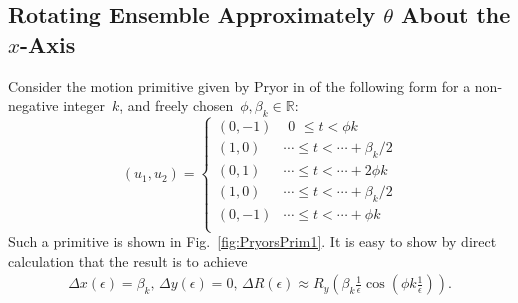 \documentclass[letter paper, 10pt, conference]{ieeeconf}
\providecommand{\field}[1]{\mathbb{#1}}
\providecommand{\R}{\field{R}}
\begin{document}
 \subsection{Rotating Ensemble Approximately $\theta$ About the $x$-Axis}
Consider the motion primitive given by Pryor in \cite{Pryor2007a} of the following form for a non-negative integer~$k$, and freely chosen~$\phi,\beta_{k} \in \R$:
\begin{equation}
(u_1,u_2)
=
\begin{cases}
(0,-1) & \,\,0\,\, \leq t < \phi k \\
(1,0) & \dotsm   \leq t < \dotsm+  \beta_k/2\\
(0,1) & \dotsm \leq t < \dotsm+ 2\phi k \\
(1,0) & \dotsm  \leq t < \dotsm+  \beta_k/2\\
(0,-1) & \dotsm \leq t < \dotsm+ \phi k \\   
\end{cases}\label{eq:PWSpherePrim}
\end{equation}
Such a primitive is shown in Fig.~\ref{fig:PryorsPrim1}. It is easy to show by direct calculation that the result
is to achieve
\begin{align*}
\Delta x(\epsilon) = \beta_k , \, \Delta y(\epsilon) = 0, \,
\Delta R(\epsilon)  \approx R_y\left(\beta_k \frac{1}{\epsilon} \cos(\phi k \frac{1}{\epsilon})\right).
\end{align*}
\end{document}
